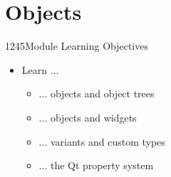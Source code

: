\section{Objects}

\begin{slide}{1245}{Module Learning Objectives}
\begin{itemize}
\item Learn ...
  \begin{itemize}
  \item ... objects and object trees
  \item ... objects and widgets
  \item ... variants and custom types
  \item ... the Qt property system
  \end{itemize}
\end{itemize}

\end{slide}







